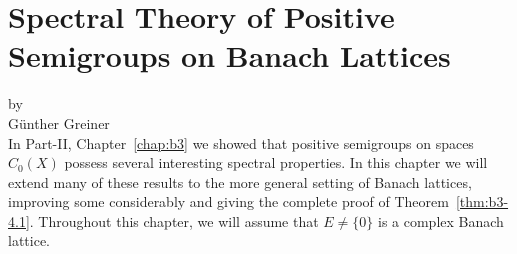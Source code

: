 \chapter[Spectral Theory on Banach Lattices]{Spectral Theory of Positive Semigroups on Banach Lattices}\label{chap:c3}
\thispagestyle{empty}
{\Large
\vspace*{-.75cm}
by \\[.25em]
Günther Greiner
\vspace{.75cm}
\\
}
In Part-II, Chapter~\ref{chap:b3} we showed that positive semigroups on spaces $C_{0}(X)$ possess several interesting spectral properties.
In this chapter we will extend many of these results to the more general setting of Banach lattices, 
improving some considerably and giving the complete proof of Theorem~\ref{thm:b3-4.1}. 
Throughout this chapter, we will assume that $E \neq \{0\}$ is a complex Banach lattice.

